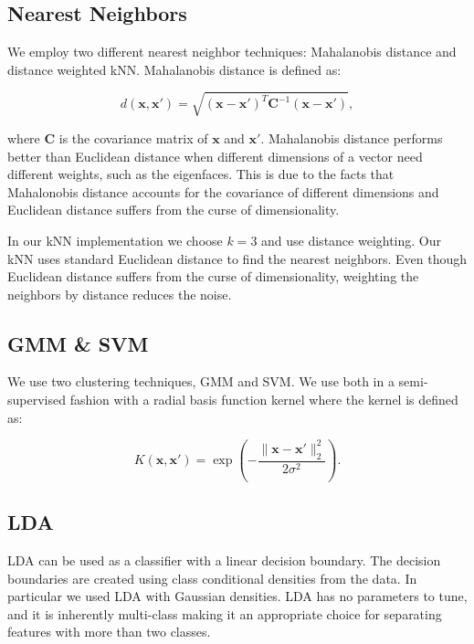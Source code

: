 \documentclass{article} %
\begin{document}
\subsection{Nearest Neighbors}

We employ two different nearest neighbor techniques: Mahalanobis distance and distance weighted kNN.  Mahalanobis distance is defined as\cite{mur12}:

\[
	d(\mathbf{x}, \mathbf{x'}) = \sqrt{(\mathbf{x} - \mathbf{x'})^T \mathbf{C}^{-1} (\mathbf{x} - \mathbf{x'})},
\]

where $\mathbf{C}$ is the covariance matrix of $\mathbf{x}$ and $\mathbf{x'}$.  Mahalanobis distance performs better than Euclidean distance when different dimensions of a vector need different weights, such as the eigenfaces.  This is due to the facts that Mahalonobis distance accounts for the covariance of different dimensions and Euclidean distance suffers from the curse of dimensionality. 

In our kNN implementation we choose $k = 3$ and use distance weighting.  Our kNN uses standard Euclidean distance to find the nearest neighbors.  Even though Euclidean distance suffers from the curse of dimensionality, weighting the neighbors by distance reduces the noise\cite{mur12}.  

\subsection{GMM \& SVM}

We use two clustering techniques, GMM and SVM.  We use both in a semi-supervised fashion with a radial basis function kernel where the kernel is defined as\cite{ski11,mur12}:

\[
	K(\mathbf{x}, \mathbf{x'}) = \exp \left(-\frac{\| \mathbf{x} - \mathbf{x'} \|_2^2}{2 \sigma^2} \right).
\]

\subsection{LDA}

LDA can be used as a classifier with a linear decision boundary.  The decision boundaries are created using class conditional densities from the data. In particular we used LDA with Gaussian densities.  LDA has no parameters to tune, and it is inherently multi-class making it an appropriate choice for separating features with more than two classes\cite{ski11,mur12}.  
\end{document}

